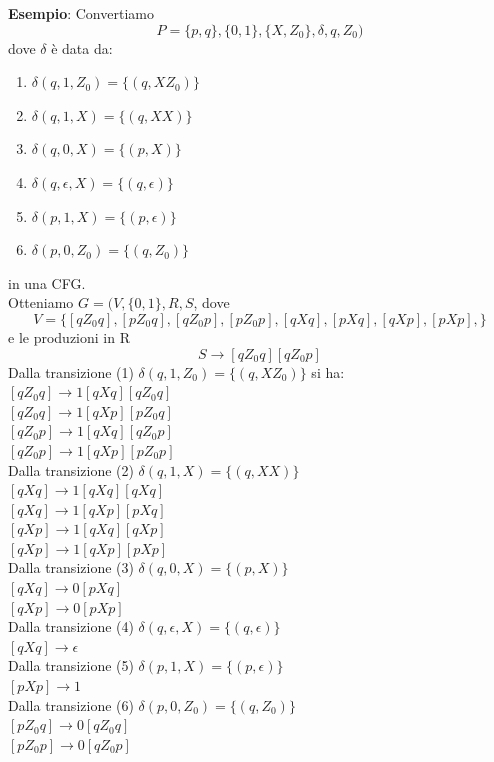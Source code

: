\documentclass[12pt]{article}
\begin{document}
\textbf{Esempio}: Convertiamo 
\[ P = \{p,q\}, \{0,1\},\{X,Z_0\},\delta, q, Z_0) \]
dove $\delta$ è data da: 
\begin{enumerate}
  \item $\delta(q,1,Z_0) = \{(q,XZ_0)\}$
  \item $\delta(q,1,X) = \{(q,XX)\}$
  \item $\delta(q,0,X) = \{(p,X)\}$
  \item $\delta(q,\epsilon,X) = \{(q,\epsilon)\}$
  \item $\delta(p,1,X) = \{(p,\epsilon)\}$
  \item $\delta(p,0,Z_0) = \{(q,Z_0)\}$
\end{enumerate}
in una CFG.
\\ Otteniamo $G=(V,\{0,1\},R,S$, dove 
\[ V = \{[qZ_0q],[pZ_0q],[qZ_0p],[pZ_0p], [qXq],[pXq],[qXp],[pXp],\} \]
e le produzioni in R 
\[ S \rightarrow [q Z_0 q] [qZ_0p]\]
Dalla transizione (1) $\delta(q,1,Z_0) = \{(q,XZ_0)\}$ si ha:
\\ $[q Z_0 q] \rightarrow 1[qXq][qZ_0 q]$
\\ $[q Z_0 q] \rightarrow 1[qXp][pZ_0 q]$
\\ $[q Z_0 p] \rightarrow 1[qXq][qZ_0 p]$
\\ $[q Z_0 p] \rightarrow 1[qXp][pZ_0 p]$
\vspace{2mm}
\\ Dalla transizione (2) $\delta(q,1,X) = \{(q,XX)\}$
\\ $[qXq] \rightarrow 1[qXq][qXq]$
\\ $[qXq] \rightarrow 1[qXp][pXq]$
\\ $[qXp] \rightarrow 1[qXq][qXp]$
\\ $[qXp] \rightarrow 1[qXp][pXp]$
\vspace{2mm}
\\ Dalla transizione (3) $\delta(q,0,X) = \{(p,X)\}$
\\ $[qXq] \rightarrow 0[pXq]$
\\ $[qXp] \rightarrow 0[pXp]$
\vspace{2mm}
\\ Dalla transizione (4) $\delta(q,\epsilon,X) = \{(q,\epsilon)\}$
\\ $[qXq] \rightarrow \epsilon$
\vspace{2mm}
\\ Dalla transizione (5) $\delta(p,1,X) = \{(p,\epsilon)\}$
\\ $[pXp] \rightarrow 1$
\vspace{2mm}
\\ Dalla transizione (6) $\delta(p,0,Z_0) = \{(q,Z_0)\}$
\\ $[pZ_0 q] \rightarrow 0[qZ_0 q]$
\\ $[pZ_0 p] \rightarrow 0[qZ_0 p]$
\end{document}
